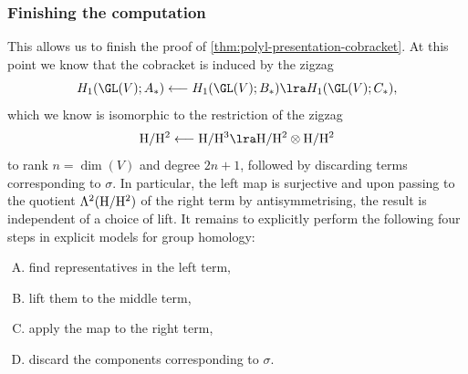 \documentclass[a4paper]{amsart}
\begin{document}
\subsubsection{Finishing the computation}
This allows us to finish the proof of \cref{thm:polyl-presentation-cobracket}. At this point we know that the cobracket is induced by the zigzag
\[H_1(\GL(V);A_*) \longleftarrow H_1(\GL(V);B_*) \lra H_1(\GL(V);C_*),\]
which we know is isomorphic to the restriction of the zigzag
\[\rm{H}/\rm{H}^2 \longleftarrow \rm{H}/\rm{H}^3 \lra \rm{H}/\rm{H}^2 \otimes \rm{H}/\rm{H}^2\]
to rank $n = \dim(V)$ and degree $2n+1$, followed by discarding terms corresponding to $\sigma$. In particular, the left map is surjective and upon passing to the quotient $\Lambda^2(\rm{H}/\rm{H}^2)$ of the right term by antisymmetrising, the result is independent of a choice of lift. It remains to explicitly perform the following four steps in explicit models for group homology: 
\begin{enumerate}[(A)]
    \item \label{enum:cobracket-a} find representatives in the left term, 
    \item \label{enum:cobracket-b} lift them to the middle term, 
    \item \label{enum:cobracket-c} apply the map to the right term,
    \item \label{enum:cobracket-d} discard the components corresponding to $\sigma$.
\end{enumerate}
\end{document}
